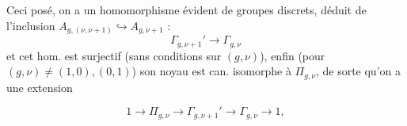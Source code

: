 Ceci posé, on a un homomorphisme évident de groupes discrets, déduit de l'inclusion  $A_{g,(\nu,\nu+1)}\hookrightarrow A_{g,\nu+1}$ :
\[
\tag{42}
\Gamma_{g,\nu+1}'\longrightarrow\Gamma_{g,\nu}
\]
et cet hom. est surjectif (sans conditions sur $(g,\nu)$), enfin (pour $(g,\nu)\ne(1,0),(0,1)$) son noyau est can. isomorphe à $\Pi_{g,\nu}$, de sorte qu'on a une extension


\[
\tag{43}
1\longrightarrow\Pi_{g,\nu}\longrightarrow\Gamma_{g,\nu+1}'
\longrightarrow\Gamma_{g,\nu}\longrightarrow1,
\]
